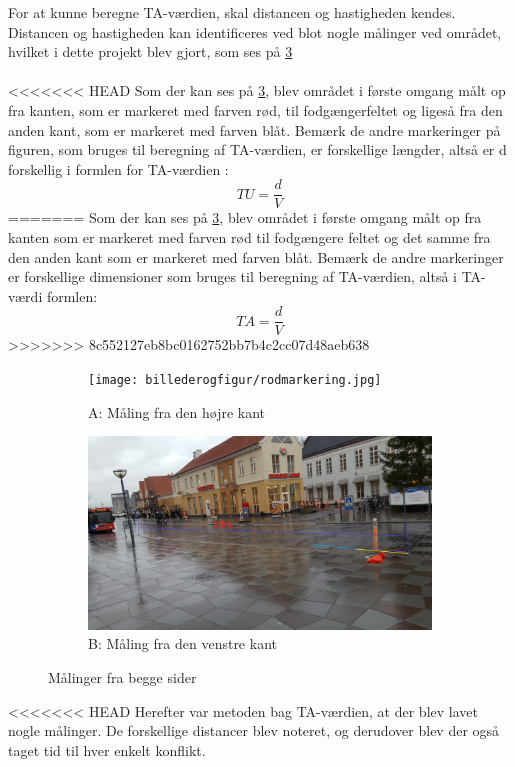 For at kunne beregne TA-værdien, skal distancen og hastigheden kendes. Distancen og hastigheden kan identificeres ved blot nogle målinger ved området, hvilket i dette projekt blev gjort, som ses på \cref{fig:maalingerfrabegge}
\\\\
<<<<<<< HEAD
Som der kan ses på \cref{fig:maalingerfrabegge}, blev området i første omgang målt op fra kanten, som er markeret med farven rød, til fodgængerfeltet og ligeså fra den anden kant, som er markeret med farven blåt. Bemærk de andre markeringer på figuren, som bruges til beregning af TA-værdien, er forskellige længder, altså er d forskellig i formlen for TA-værdien : $$ TU=\frac{d}{V} $$
=======
Som der kan ses på \cref{fig:maalingerfrabegge}, blev området i første omgang målt op fra kanten som er markeret med farven rød til fodgængere feltet og det samme fra den anden kant som er markeret med farven blåt. Bemærk de andre markeringer er forskellige dimensioner som bruges til beregning af TA-værdien, altså i TA-værdi formlen:
$$ TA=\frac{d}{V} $$
>>>>>>> 8c552127eb8bc0162752bb7b4c2cc07d48aeb638
\begin{figure}
\centering
\begin{subfigure}{1\textwidth}
  \centering
  \texttt{[image: billederogfigur/rodmarkering.jpg]}
  \caption{A: Måling fra den højre kant}
  \label{fig:obsomrrod}
\end{subfigure}
\begin{subfigure}{1\textwidth}
  \centering
  \includegraphics[width=1\linewidth]{billederogfigur/blaamarkering.jpg}
  \caption{B: Måling fra den venstre kant}
  \label{fig:obsomrblaa}
\end{subfigure}
\caption{Målinger fra begge sider}
\label{fig:maalingerfrabegge}
\end{figure}
<<<<<<< HEAD
Herefter var metoden bag TA-værdien, at der blev lavet nogle målinger. De forskellige distancer blev noteret, og derudover blev der også taget tid til hver enkelt konflikt.
